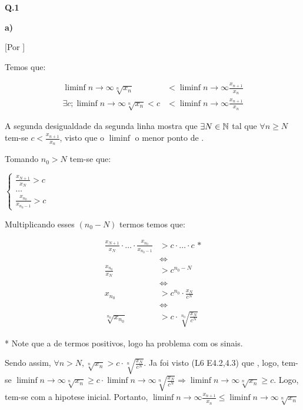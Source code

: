 \textbf{Q.1}

\textbf{a)}

[Por \contradicao]

Temos que:

\begin{align*}
\liminf{n\rightarrow\infty} \sqrt[n]{x_n} &< \liminf{n\rightarrow\infty} \frac{x_{n+1}}{x_n} \\
\exists c; \liminf{n\rightarrow\infty} \sqrt[n]{x_n} < c &<  \liminf{n\rightarrow\infty} \frac{x_{n+1}}{x_n}
\end{align*}

A segunda desigualdade da segunda linha mostra que $\exists N\in\mathbb{N}$ tal que $\forall n \ge N$ tem-se $c < \frac{x_{n+1}}{x_n}$, visto que o $\liminf{}$ \eh o menor ponto de \acumulacao.

Tomando $n_0 > N$ tem-se que:

$\begin{cases*}
	\frac{x_{N+1}}{x_N} > c \\
	\ldots \\
	\frac{x_{n_0}}{x_{n_0 - 1}} > c
\end{cases*}$

Multiplicando esses $(n_0 - N)$ termos temos que:

\begin{align*}
	\frac{x_{N+1}}{x_N} \cdot \ldots \cdot \frac{x_{n_0}}{x_{n_0 - 1}} &> c \cdot \ldots \cdot c \text{ *} \\
	&\iff \\
	\frac{x_{n_0}}{x_N} &> c^{n_0 - N}\\
	&\iff\\
	x_{n_0} &> c^{n_0} \cdot \frac{x_N}{c^N} \\
	&\iff\\
	\sqrt[n_0]{x_{n_0}} &> c \cdot \sqrt[n_0]{\frac{x_N}{c^N}}
\end{align*}

* Note que a \sequencia \eh de termos positivos, logo \nao ha problema com os sinais.

Sendo assim, $\forall n > N, \sqrt[n]{x_n} > c \cdot \sqrt[n]{\frac{x_N}{c^N}}$. Ja foi visto (L6 E4.2,4.3) que \mbox{}, logo, tem-se 
$
\liminf{n\rightarrow\infty}\sqrt[n]{x_n} \ge c \cdot \liminf{n\rightarrow\infty} \sqrt[n]{\frac{x_N}{c^N}} \Rightarrow 
\liminf{n\rightarrow\infty}\sqrt[n]{x_n} \ge c
$. Logo, tem-se \contradicao com a hipotese inicial. Portanto, $\liminf{n\rightarrow\infty} \frac{x_{n+1}}{x_n} \le \liminf{n\rightarrow\infty} \sqrt[n]{x_n}$

